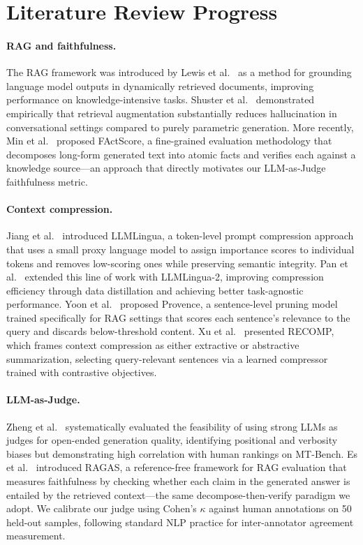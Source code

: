 \documentclass[11pt,a4paper]{article}
\begin{document}
\section{Literature Review Progress}

\paragraph{RAG and faithfulness.}
The RAG framework was introduced by Lewis et al.\ \cite{lewis2020rag} as a method for grounding language model outputs in dynamically retrieved documents, improving performance on knowledge-intensive tasks. Shuster et al.\ \cite{shuster2021retrieval} demonstrated empirically that retrieval augmentation substantially reduces hallucination in conversational settings compared to purely parametric generation. More recently, Min et al.\ \cite{min2023factscore} proposed FActScore, a fine-grained evaluation methodology that decomposes long-form generated text into atomic facts and verifies each against a knowledge source---an approach that directly motivates our LLM-as-Judge faithfulness metric.

\paragraph{Context compression.}
Jiang et al.\ \cite{jiang2023llmlingua} introduced LLMLingua, a token-level prompt compression approach that uses a small proxy language model to assign importance scores to individual tokens and removes low-scoring ones while preserving semantic integrity. Pan et al.\ \cite{pan2024llmlingua2} extended this line of work with LLMLingua-2, improving compression efficiency through data distillation and achieving better task-agnostic performance. Yoon et al.\ \cite{yoon2024provence} proposed Provence, a sentence-level pruning model trained specifically for RAG settings that scores each sentence's relevance to the query and discards below-threshold content. Xu et al.\ \cite{xu2023recomp} presented RECOMP, which frames context compression as either extractive or abstractive summarization, selecting query-relevant sentences via a learned compressor trained with contrastive objectives.

\paragraph{LLM-as-Judge.}
Zheng et al.\ \cite{zheng2023mtbench} systematically evaluated the feasibility of using strong LLMs as judges for open-ended generation quality, identifying positional and verbosity biases but demonstrating high correlation with human rankings on MT-Bench. Es et al.\ \cite{es2023ragas} introduced RAGAS, a reference-free framework for RAG evaluation that measures faithfulness by checking whether each claim in the generated answer is entailed by the retrieved context---the same decompose-then-verify paradigm we adopt. We calibrate our judge using Cohen's $\kappa$ against human annotations on 50 held-out samples, following standard NLP practice for inter-annotator agreement measurement.
\end{document}
